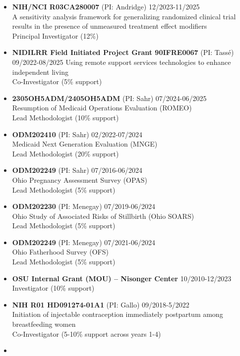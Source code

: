 \documentclass[
  english,
  letterpaper,
  DIV=11,
  numbers=noendperiod]{scrartcl}
\providecommand{\tightlist}{%
  \setlength{\itemsep}{0pt}\setlength{\parskip}{0pt}}
\begin{document}
\begin{itemize}
\tightlist
\item
  \textbf{NIH/NCI R03CA280007} (PI: Andridge) {12/2023-11/2025}\\
  A sensitivity analysis framework for generalizing randomized clinical
  trial results in the presence of unmeasured treatment effect
  modifiers\\
  Principal Investigator (12\%)
\item
  \textbf{NIDILRR Field Initiated Project Grant 90IFRE0067} (PI: Tassé)
  {09/2022-08/2025} Using remote support services technologies to
  enhance independent living\\
  Co-Investigator (5\% support)
\item
  \textbf{2305OH5ADM/2405OH5ADM} (PI: Sahr) {07/2024-06/2025}\\
  Resumption of Medicaid Operations Evaluation (ROMEO)\\
  Lead Methodologist (10\% support)
\item
  \textbf{ODM202410} (PI: Sahr) {02/2022-07/2024}\\
  Medicaid Next Generation Evaluation (MNGE)\\
  Lead Methodologist (20\% support)
\item
  \textbf{ODM202249} (PI: Sahr) {07/2016-06/2024}\\
  Ohio Pregnancy Assessment Survey (OPAS)\\
  Lead Methodologist (5\% support)
\item
  \textbf{ODM202230} (PI: Menegay) {07/2019-06/2024}\\
  Ohio Study of Associated Risks of Stillbirth (Ohio SOARS)\\
  Lead Methodologist (5\% support)
\item
  \textbf{ODM202249} (PI: Menegay) {07/2021-06/2024}\\
  Ohio Fatherhood Survey (OFS)\\
  Lead Methodologist (5\% support)
\item
  \textbf{OSU Internal Grant (MOU) -- Nisonger Center}
  {10/2010-12/2023}\\
  Investigator (10\% support)
\item
  \textbf{NIH R01 HD091274-01A1} (PI: Gallo) {09/2018-5/2022}\\
  Initiation of injectable contraception immediately postpartum among
  breastfeeding women\\
  Co-Investigator (5-10\% support across years 1-4)
\item

\end{itemize}
\end{document}

